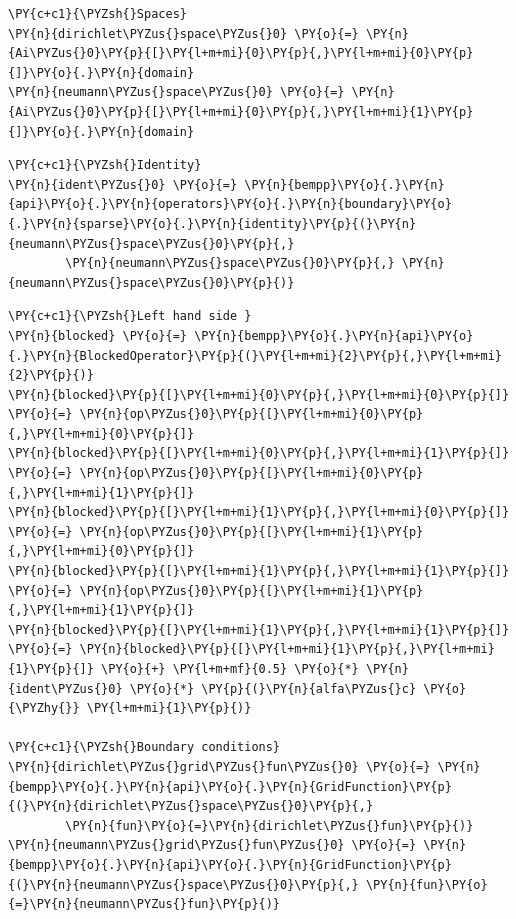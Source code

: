 \begin{tcolorbox}
\begin{Verbatim}[commandchars=\\\{\}]
\PY{c+c1}{\PYZsh{}Spaces}
\PY{n}{dirichlet\PYZus{}space\PYZus{}0} \PY{o}{=} \PY{n}{Ai\PYZus{}0}\PY{p}{[}\PY{l+m+mi}{0}\PY{p}{,}\PY{l+m+mi}{0}\PY{p}{]}\PY{o}{.}\PY{n}{domain}
\PY{n}{neumann\PYZus{}space\PYZus{}0} \PY{o}{=} \PY{n}{Ai\PYZus{}0}\PY{p}{[}\PY{l+m+mi}{0}\PY{p}{,}\PY{l+m+mi}{1}\PY{p}{]}\PY{o}{.}\PY{n}{domain}
\end{Verbatim}
\end{tcolorbox}

\begin{tcolorbox}
\begin{Verbatim}[commandchars=\\\{\}]
\PY{c+c1}{\PYZsh{}Identity}
\PY{n}{ident\PYZus{}0} \PY{o}{=} \PY{n}{bempp}\PY{o}{.}\PY{n}{api}\PY{o}{.}\PY{n}{operators}\PY{o}{.}\PY{n}{boundary}\PY{o}{.}\PY{n}{sparse}\PY{o}{.}\PY{n}{identity}\PY{p}{(}\PY{n}{neumann\PYZus{}space\PYZus{}0}\PY{p}{,} 
		\PY{n}{neumann\PYZus{}space\PYZus{}0}\PY{p}{,} \PY{n}{neumann\PYZus{}space\PYZus{}0}\PY{p}{)}
\end{Verbatim}
\end{tcolorbox}


\begin{tcolorbox}
\begin{Verbatim}[commandchars=\\\{\}]
\PY{c+c1}{\PYZsh{}Left hand side }
\PY{n}{blocked} \PY{o}{=} \PY{n}{bempp}\PY{o}{.}\PY{n}{api}\PY{o}{.}\PY{n}{BlockedOperator}\PY{p}{(}\PY{l+m+mi}{2}\PY{p}{,}\PY{l+m+mi}{2}\PY{p}{)}
\PY{n}{blocked}\PY{p}{[}\PY{l+m+mi}{0}\PY{p}{,}\PY{l+m+mi}{0}\PY{p}{]} \PY{o}{=} \PY{n}{op\PYZus{}0}\PY{p}{[}\PY{l+m+mi}{0}\PY{p}{,}\PY{l+m+mi}{0}\PY{p}{]}
\PY{n}{blocked}\PY{p}{[}\PY{l+m+mi}{0}\PY{p}{,}\PY{l+m+mi}{1}\PY{p}{]} \PY{o}{=} \PY{n}{op\PYZus{}0}\PY{p}{[}\PY{l+m+mi}{0}\PY{p}{,}\PY{l+m+mi}{1}\PY{p}{]}
\PY{n}{blocked}\PY{p}{[}\PY{l+m+mi}{1}\PY{p}{,}\PY{l+m+mi}{0}\PY{p}{]} \PY{o}{=} \PY{n}{op\PYZus{}0}\PY{p}{[}\PY{l+m+mi}{1}\PY{p}{,}\PY{l+m+mi}{0}\PY{p}{]}
\PY{n}{blocked}\PY{p}{[}\PY{l+m+mi}{1}\PY{p}{,}\PY{l+m+mi}{1}\PY{p}{]} \PY{o}{=} \PY{n}{op\PYZus{}0}\PY{p}{[}\PY{l+m+mi}{1}\PY{p}{,}\PY{l+m+mi}{1}\PY{p}{]}
\PY{n}{blocked}\PY{p}{[}\PY{l+m+mi}{1}\PY{p}{,}\PY{l+m+mi}{1}\PY{p}{]} \PY{o}{=} \PY{n}{blocked}\PY{p}{[}\PY{l+m+mi}{1}\PY{p}{,}\PY{l+m+mi}{1}\PY{p}{]} \PY{o}{+} \PY{l+m+mf}{0.5} \PY{o}{*} \PY{n}{ident\PYZus{}0} \PY{o}{*} \PY{p}{(}\PY{n}{alfa\PYZus{}c} \PY{o}{\PYZhy{}} \PY{l+m+mi}{1}\PY{p}{)}
        
\PY{c+c1}{\PYZsh{}Boundary conditions}
\PY{n}{dirichlet\PYZus{}grid\PYZus{}fun\PYZus{}0} \PY{o}{=} \PY{n}{bempp}\PY{o}{.}\PY{n}{api}\PY{o}{.}\PY{n}{GridFunction}\PY{p}{(}\PY{n}{dirichlet\PYZus{}space\PYZus{}0}\PY{p}{,} 
		\PY{n}{fun}\PY{o}{=}\PY{n}{dirichlet\PYZus{}fun}\PY{p}{)}
\PY{n}{neumann\PYZus{}grid\PYZus{}fun\PYZus{}0} \PY{o}{=} \PY{n}{bempp}\PY{o}{.}\PY{n}{api}\PY{o}{.}\PY{n}{GridFunction}\PY{p}{(}\PY{n}{neumann\PYZus{}space\PYZus{}0}\PY{p}{,} \PY{n}{fun}\PY{o}{=}\PY{n}{neumann\PYZus{}fun}\PY{p}{)}
\end{Verbatim}
\end{tcolorbox}

